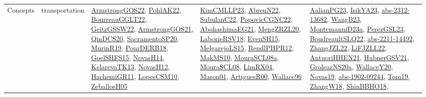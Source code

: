 {\begin{longtable}{lp{3cm}>{\raggedright}p{6cm}>{\raggedright}p{6cm}p{8cm}}
Concepts & transportation & \href{papers/ArmstrongGOS22.pdf}{ArmstrongGOS22}\cite{ArmstrongGOS22}, \href{articles/PohlAK22.pdf}{PohlAK22}\cite{PohlAK22}, \href{articles/BourreauGGLT22.pdf}{BourreauGGLT22}\cite{BourreauGGLT22}, \href{papers/GeitzGSSW22.pdf}{GeitzGSSW22}\cite{GeitzGSSW22}, \href{papers/ArmstrongGOS21.pdf}{ArmstrongGOS21}\cite{ArmstrongGOS21}, \href{articles/QinDCS20.pdf}{QinDCS20}\cite{QinDCS20}, \href{articles/SacramentoSP20.pdf}{SacramentoSP20}\cite{SacramentoSP20}, \href{papers/MurinR19.pdf}{MurinR19}\cite{MurinR19}, \href{articles/PourDERB18.pdf}{PourDERB18}\cite{PourDERB18}, \href{articles/GoelSHFS15.pdf}{GoelSHFS15}\cite{GoelSHFS15}, \href{articles/NovasH14.pdf}{NovasH14}\cite{NovasH14}, \href{papers/KelarevaTK13.pdf}{KelarevaTK13}\cite{KelarevaTK13}, \href{articles/NovasH12.pdf}{NovasH12}\cite{NovasH12}, \href{articles/HachemiGR11.pdf}{HachemiGR11}\cite{HachemiGR11}, \href{articles/LopesCSM10.pdf}{LopesCSM10}\cite{LopesCSM10}, \href{articles/ZeballosH05.pdf}{ZeballosH05}\cite{ZeballosH05} & \href{papers/KimCMLLP23.pdf}{KimCMLLP23}\cite{KimCMLLP23}, \href{articles/AbreuN22.pdf}{AbreuN22}\cite{AbreuN22}, \href{articles/SubulanC22.pdf}{SubulanC22}\cite{SubulanC22}, \href{papers/PopovicCGNC22.pdf}{PopovicCGNC22}\cite{PopovicCGNC22}, \href{articles/AbohashimaEG21.pdf}{AbohashimaEG21}\cite{AbohashimaEG21}, \href{articles/MengZRZL20.pdf}{MengZRZL20}\cite{MengZRZL20}, \href{articles/LaborieRSV18.pdf}{LaborieRSV18}\cite{LaborieRSV18}, \href{papers/EvenSH15.pdf}{EvenSH15}\cite{EvenSH15}, \href{papers/MelgarejoLS15.pdf}{MelgarejoLS15}\cite{MelgarejoLS15}, \href{papers/RendlPHPR12.pdf}{RendlPHPR12}\cite{RendlPHPR12}, \href{papers/MakMS10.pdf}{MakMS10}\cite{MakMS10}, \href{papers/MouraSCL08a.pdf}{MouraSCL08a}\cite{MouraSCL08a}, \href{papers/MouraSCL08.pdf}{MouraSCL08}\cite{MouraSCL08}, \href{papers/LimRX04.pdf}{LimRX04}\cite{LimRX04}, \href{articles/Mason01.pdf}{Mason01}\cite{Mason01}, \href{articles/ArtiguesR00.pdf}{ArtiguesR00}\cite{ArtiguesR00}, \href{articles/Wallace96.pdf}{Wallace96}\cite{Wallace96} & \href{papers/AalianPG23.pdf}{AalianPG23}\cite{AalianPG23}, \href{articles/IsikYA23.pdf}{IsikYA23}\cite{IsikYA23}, \href{articles/abs-2312-13682.pdf}{abs-2312-13682}\cite{abs-2312-13682}, \href{papers/WangB23.pdf}{WangB23}\cite{WangB23}, \href{articles/MontemanniD23a.pdf}{MontemanniD23a}\cite{MontemanniD23a}, \href{papers/PerezGSL23.pdf}{PerezGSL23}\cite{PerezGSL23}, \href{papers/BoudreaultSLQ22.pdf}{BoudreaultSLQ22}\cite{BoudreaultSLQ22}, \href{articles/abs-2211-14492.pdf}{abs-2211-14492}\cite{abs-2211-14492}, \href{papers/ZhangJZL22.pdf}{ZhangJZL22}\cite{ZhangJZL22}, \href{papers/LiFJZLL22.pdf}{LiFJZLL22}\cite{LiFJZLL22}, \href{papers/AntuoriHHEN21.pdf}{AntuoriHHEN21}\cite{AntuoriHHEN21}, \href{articles/HubnerGSV21.pdf}{HubnerGSV21}\cite{HubnerGSV21}, \href{papers/GroleazNS20a.pdf}{GroleazNS20a}\cite{GroleazNS20a}, \href{articles/WallaceY20.pdf}{WallaceY20}\cite{WallaceY20}, \href{articles/Novas19.pdf}{Novas19}\cite{Novas19}, \href{articles/abs-1902-09244.pdf}{abs-1902-09244}\cite{abs-1902-09244}, \href{papers/Tom19.pdf}{Tom19}\cite{Tom19}, \href{articles/ZhangW18.pdf}{ZhangW18}\cite{ZhangW18}, \href{articles/ShinBBHO18.pdf}{ShinBBHO18}\cite{ShinBBHO18}, 
\end{longtable}}
